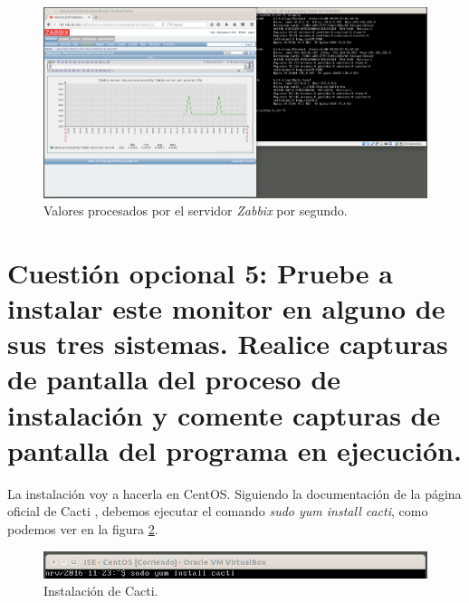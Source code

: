 \documentclass[a4paper,titlepage,12pt]{report}	%
\numberwithin{figure}{section} %
\numberwithin{table}{section} %
\begin{document}
	\begin{figure}[H]
	   \includegraphics[width=\linewidth]{./Imagenes/P3/O4-18.png}
	   \vspace{-0.5cm}
	   \caption[Valores procesados por el servidor \textit{Zabbix} por segundo.]{Valores procesados por el servidor \textit{Zabbix} por segundo.}
	   \label{P3-O4-18}
	\end{figure}

	\section[Cuestión opcional 5: Pruebe a instalar este monitor en alguno de sus tres sistemas. Realice capturas de pantalla del proceso de instalación y comente capturas de pantalla del programa en ejecución.]{Cuestión opcional 5: Pruebe a instalar este monitor en alguno de sus tres sistemas. Realice capturas de pantalla del proceso de instalación y comente capturas de pantalla del programa en ejecución.}

	La instalación voy a hacerla en CentOS. Siguiendo la documentación de la página oficial de Cacti \cite{cacti}, debemos ejecutar el comando \textit{sudo yum install cacti}, como podemos ver en la figura \ref{P3-O5-instalacion}.

	\begin{figure}[H]
	   \includegraphics[width=\linewidth]{./Imagenes/P3/O5-instalacion.png}
	   \vspace{-0.5cm}
	   \caption[Instalación de Cacti.]{Instalación de Cacti.}
	   \label{P3-O5-instalacion}
	\end{figure}
\end{document}
